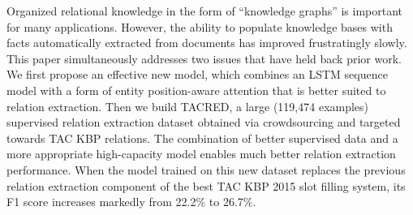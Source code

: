 Organized relational knowledge in the form of ``knowledge graphs'' is important for many applications. However, the ability to populate knowledge bases with facts automatically extracted from documents has improved frustratingly slowly. This paper simultaneously addresses two issues that have held back prior work. We first propose an effective new model, which combines an LSTM sequence model with a form of entity position-aware attention that is better suited to relation extraction. Then we build TACRED, a large (119,474 examples) supervised relation extraction dataset obtained via crowdsourcing and targeted towards TAC KBP relations. The combination of better supervised data and a more appropriate high-capacity model enables much better relation extraction performance. When the model trained on this new dataset replaces the previous relation extraction component of the best TAC KBP 2015 slot filling system, its F1 score increases markedly from 22.2\% to 26.7\%.
